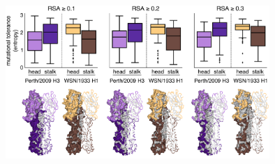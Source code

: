 \documentclass[9pt,twocolumn,twoside]{pnas-new}
\begin{document}
\begin{suppfigure}[H]
\centerline{\includegraphics[width=0.75\textwidth]{figs/supp_head_stalk_RSA/head_stalk_RSA.pdf}}
\caption{\label{suppfig:head_stalk_RSA}
{\bf Mutational tolerances of the head and stalk domains at various relative solvent accessibility cutoffs.}
The mutational tolerances of the head and stalk domains show less disparity for the Perth/2009 H3 HA compared to those for the WSN/1933 H1 HA.
We used relative solvent accessibility (RSA) cutoffs of $0.1$, $0.2$, and $0.3$ to define solvent-exposed residues and plotted the mutational tolerances (Shannon entropy of re-scaled preferences) of these residues in the head and stalk domains for the Perth/2009 H3 HA (purple) and the WSN/1933 H1 HA (brown).
Residues falling in between the two cysteines at sites 52 and 277 were defined as belonging to the head domain, while all other residues were defined as the stalk domain.
The HA structures color the residues that are defined as solvent exposed at a given RSA cutoff.
One monomer is shown in surface representation and another monomer shown in ribbon representation.
Residues in lighter shades of purple or brown are in the head domain, while residues in darker shades are in the stalk domain.
Note that the mutational tolerance values are not comparable between the two HAs.
}
\end{suppfigure}
\end{document}
